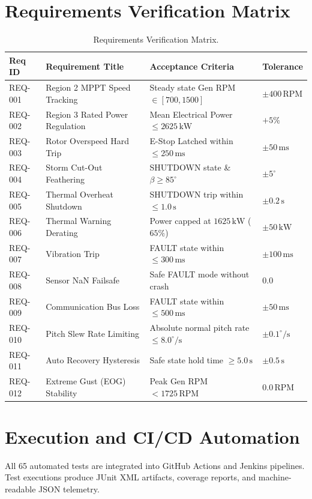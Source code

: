 \documentclass[11pt,a4paper]{article}
\begin{document}
\section{Requirements Verification Matrix}
\begin{table}[h]
\centering
\small
\begin{tabular}{@{}llll@{}}
\toprule
\textbf{Req ID} & \textbf{Requirement Title} & \textbf{Acceptance Criteria} & \textbf{Tolerance} \\ \midrule
REQ-001 & Region 2 MPPT Speed Tracking & Steady state Gen RPM $\in [700, 1500]$ & $\pm 400\,\text{RPM}$ \\
REQ-002 & Region 3 Rated Power Regulation & Mean Electrical Power $\le 2625\,\text{kW}$ & $+5\%$ \\
REQ-003 & Rotor Overspeed Hard Trip & E-Stop Latched within $\le 250\,\text{ms}$ & $\pm 50\,\text{ms}$ \\
REQ-004 & Storm Cut-Out Feathering & SHUTDOWN state \& $\beta \ge 85^\circ$ & $\pm 5^\circ$ \\
REQ-005 & Thermal Overheat Shutdown & SHUTDOWN trip within $\le 1.0\,\text{s}$ & $\pm 0.2\,\text{s}$ \\
REQ-006 & Thermal Warning Derating & Power capped at $1625\,\text{kW}$ ($65\%$) & $\pm 50\,\text{kW}$ \\
REQ-007 & Vibration Trip & FAULT state within $\le 300\,\text{ms}$ & $\pm 100\,\text{ms}$ \\
REQ-008 & Sensor NaN Failsafe & Safe FAULT mode without crash & $0.0$ \\
REQ-009 & Communication Bus Loss & FAULT state within $\le 500\,\text{ms}$ & $\pm 50\,\text{ms}$ \\
REQ-010 & Pitch Slew Rate Limiting & Absolute normal pitch rate $\le 8.0^\circ/\text{s}$ & $\pm 0.1^\circ/\text{s}$ \\
REQ-011 & Auto Recovery Hysteresis & Safe state hold time $\ge 5.0\,\text{s}$ & $\pm 0.5\,\text{s}$ \\
REQ-012 & Extreme Gust (EOG) Stability & Peak Gen RPM $< 1725\,\text{RPM}$ & $0.0\,\text{RPM}$ \\ \bottomrule
\end{tabular}
\caption{Requirements Verification Matrix.}
\end{table}

\section{Execution and CI/CD Automation}
All 65 automated tests are integrated into GitHub Actions and Jenkins pipelines. Test executions produce JUnit XML artifacts, coverage reports, and machine-readable JSON telemetry.
\end{document}
